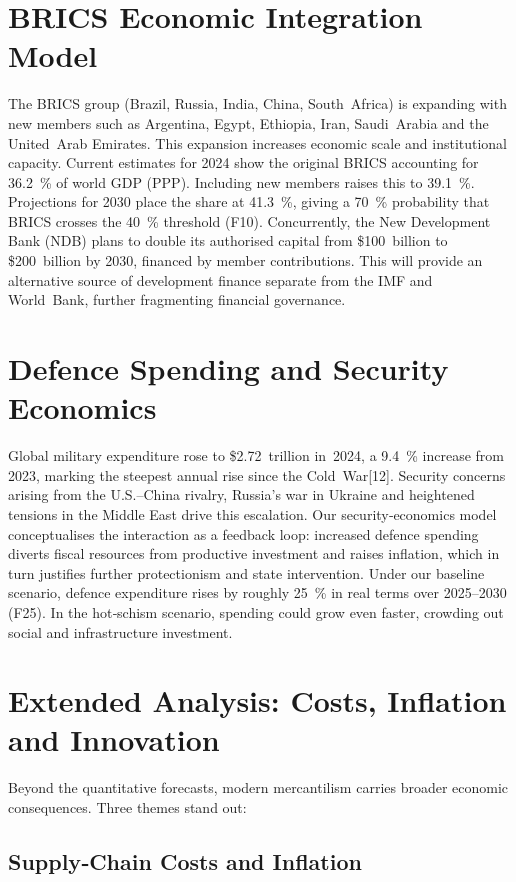 \documentclass[12pt]{article}
\begin{document}
\section{BRICS Economic Integration Model}

The BRICS group (Brazil, Russia, India, China, South Africa) is expanding with new members such as Argentina, Egypt, Ethiopia, Iran, Saudi Arabia and the United Arab Emirates.  This expansion increases economic scale and institutional capacity.  Current estimates for 2024 show the original BRICS accounting for 36.2 \% of world GDP (PPP).  Including new members raises this to 39.1 \%.  Projections for 2030 place the share at 41.3 \%, giving a 70 \% probability that BRICS crosses the 40 \% threshold (F10).  Concurrently, the New Development Bank (NDB) plans to double its authorised capital from \$100 billion to \$200 billion by 2030, financed by member contributions.  This will provide an alternative source of development finance separate from the IMF and World Bank, further fragmenting financial governance.

\section{Defence Spending and Security Economics}

Global military expenditure rose to \$2.72 trillion in 2024, a 9.4 \% increase from 2023, marking the steepest annual rise since the Cold War[12].  Security concerns arising from the U.S.–China rivalry, Russia’s war in Ukraine and heightened tensions in the Middle East drive this escalation.  Our security‑economics model conceptualises the interaction as a feedback loop: increased defence spending diverts fiscal resources from productive investment and raises inflation, which in turn justifies further protectionism and state intervention.  Under our baseline scenario, defence expenditure rises by roughly 25 \% in real terms over 2025–2030 (F25).  In the hot‑schism scenario, spending could grow even faster, crowding out social and infrastructure investment.

\section{Extended Analysis: Costs, Inflation and Innovation}

Beyond the quantitative forecasts, modern mercantilism carries broader economic consequences.  Three themes stand out:

\subsection{Supply‑Chain Costs and Inflation}
\end{document}
